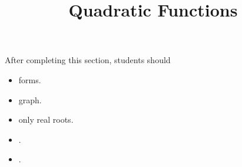 \documentclass{ximera}
\title{Quadratic Functions}
\begin{document}
\begin{abstract}
\end{abstract}
\maketitle

\begin{sectionOutcomes}
After completing this section, students should 

\begin{itemize}
\item forms.
\item graph.
\item only real roots.
\item .
\item .
\end{itemize}
\end{sectionOutcomes}
\end{document}
